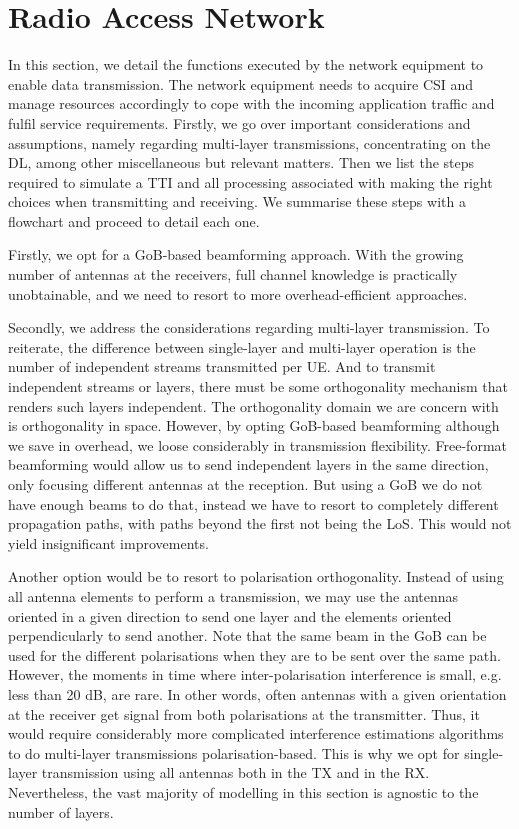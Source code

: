 \section{Radio Access Network}
\label{sec:access}

In this section, we detail the functions executed by the network equipment to enable data transmission. The network equipment needs to acquire \acs{CSI} and manage resources accordingly to cope with the incoming application traffic and fulfil service requirements. Firstly, we go over important considerations and assumptions, namely regarding multi-layer transmissions, concentrating on the \ac{DL}, among other miscellaneous but relevant matters. Then we list the steps required to simulate a \ac{TTI} and all processing associated with making the right choices when transmitting and receiving. We summarise these steps with a flowchart and proceed to detail each one.

Firstly, we opt for a \ac{GoB}-based beamforming approach. With the growing number of antennas at the receivers, full channel knowledge is practically unobtainable, and we need to resort to more overhead-efficient approaches. 

Secondly, we address the considerations regarding multi-layer transmission. To reiterate, the difference between single-layer and multi-layer operation is the number of independent streams transmitted per \ac{UE}. And to transmit independent streams or layers, there must be some orthogonality mechanism that renders such layers independent. The orthogonality domain we are concern with is orthogonality in space. However, by opting \ac{GoB}-based beamforming although we save in overhead, we loose considerably in transmission flexibility. Free-format beamforming would allow us to send independent layers in the same direction, only focusing different antennas at the reception. But using a \ac{GoB} we do not have enough beams to do that, instead we have to resort to completely different propagation paths, with paths beyond the first not being the \ac{LoS}. This would not yield insignificant improvements. 

Another option would be to resort to polarisation orthogonality. Instead of using all antenna elements to perform a transmission, we may use the antennas oriented in a given direction to send one layer and the elements oriented perpendicularly to send another. Note that the same beam in the GoB can be used for the different polarisations when they are to be sent over the same path. However, the moments in time where inter-polarisation interference is small, e.g. less than 20 dB, are rare. In other words, often antennas with a given orientation at the receiver get signal from both polarisations at the transmitter. Thus, it would require considerably more complicated interference estimations algorithms to do multi-layer transmissions polarisation-based. This is why we opt for single-layer transmission using all antennas both in the \ac{TX} and in the \ac{RX}. Nevertheless, the vast majority of modelling in this section is agnostic to the number of layers.

